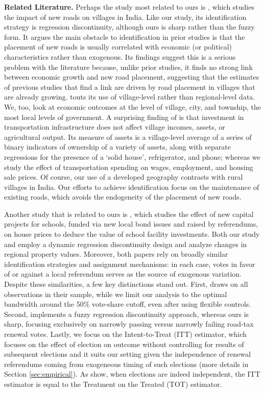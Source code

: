 {\bf Related Literature.} Perhaps the study most related to ours is \cite{asher2020}, which studies the impact of new roads on villages in India. Like our study, its identification strategy is regression discontinuity, although ours is sharp rather than the fuzzy form.  It argues the main obstacle to identification in prior studies is that the placement of new roads is usually correlated with economic (or political) characteristics rather than exogenous. Its findings suggest this is a serious problem with the literature because, unlike prior studies, it finds no strong link between economic growth and new road placement, suggesting that the estimates of previous studies that find a link are driven by road placement in villages that are already growing. \cite{asher2020} touts its use of village-level rather than regional-level data.  We, too, look at economic outcomes at the level of village, city, and township, the most local levels of government.  A surprising finding of \cite{asher2020} is that investment in transportation infrastructure does not affect village incomes, assets, or agricultural output.  Its measure of assets is a village-level average of a series of binary indicators of ownership of a variety of assets, along with separate regressions for the presence of a ‘solid house’, refrigerator, and phone; whereas we study the effect of transportation spending on wages, employment, and housing sale prices.  Of course, our use of a developed geography contrasts with rural villages in India.  Our efforts to achieve identification focus on the maintenance of existing roads, which avoids the endogeneity of the placement of new roads.

Another study that is related to ours is \cite{cellini2010value}, which studies the effect of new capital projects for schools, funded via new local bond issues and raised by referendums, on house prices to deduce the value of school facility investments. Both our study and \cite{cellini2010value} employ a dynamic regression discontinuity design and analyze changes in regional property values. Moreover, both papers rely on broadly similar identification strategies and assignment mechanisms: in each case, votes in favor of or against a local referendum serves as the source of exogenous variation. Despite these similarities, a few key distinctions stand out. First, \cite{cellini2010value} draws on all observations in their sample, while we limit our analysis to the optimal bandwidth around the 50\% vote-share cutoff, even after using flexible controls. Second, \cite{cellini2010value} implements a fuzzy regression discontinuity approach, whereas ours is sharp, focusing exclusively on narrowly passing versus narrowly failing road-tax renewal votes. Lastly, we focus on the Intent-to-Treat (ITT) estimator, which focuses on the effect of election on outcome without controlling for results of subsequent elections and it suits our setting given the independence of renewal referendums coming from exogeneous timing of such elections (more details in Section \ref{sec:empirical}). As \cite{cellini2010value} show, when elections are indeed independent, the ITT estimator is equal to the Treatment on the Treated (TOT) estimator. 

